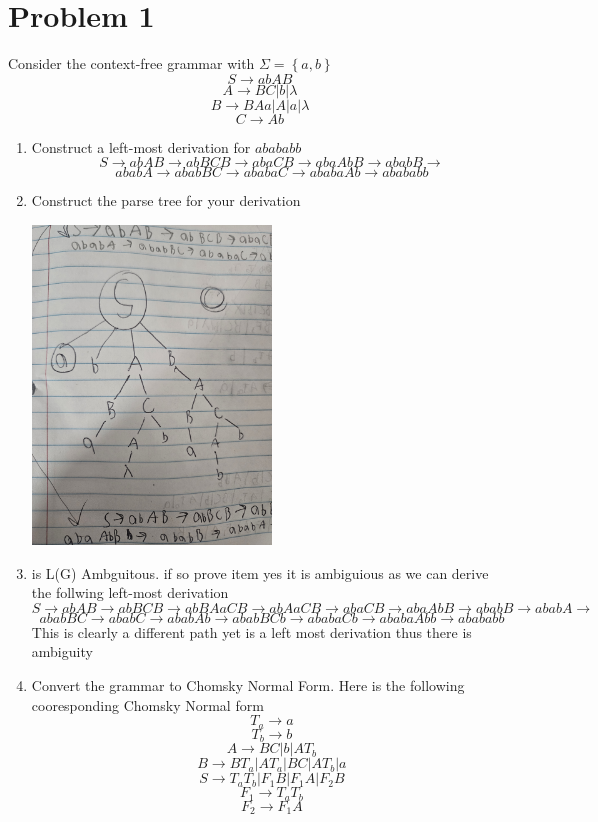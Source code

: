 \documentclass{article}
\begin{document}
\section*{Problem 1}
    Consider the context-free grammar with $\Sigma = \left\{ a,b \right\}$
    \[S \rightarrow abAB\]
    \[A \rightarrow BC|b|\lambda\]
    \[B \rightarrow BAa|A|a|\lambda\]
    \[C \rightarrow Ab\]

    \begin{enumerate}
        \item Construct a left-most derivation for $abababb$
        \[S \rightarrow abAB \rightarrow abBCB \rightarrow abaCB \rightarrow abaAbB \rightarrow ababB \rightarrow\]
        \[ ababA \rightarrow ababBC \rightarrow ababaC \rightarrow ababaAb \rightarrow abababb\]
        \item Construct the parse tree for your derivation
        \begin{center}
            \includegraphics[width=0.5\textwidth, angle=-90]{figures/tree.jpg}
        \end{center}
        \item is L(G) Ambguitous. if so prove item
        yes it is ambiguious as we can derive the follwing left-most derivation
        \[S \rightarrow abAB \rightarrow abBCB \rightarrow abBAaCB \rightarrow abAaCB \rightarrow abaCB \rightarrow abaAbB \rightarrow ababB \rightarrow ababA \rightarrow \]
        \[  ababBC \rightarrow ababC \rightarrow ababAb \rightarrow ababBCb \rightarrow ababaCb \rightarrow ababaAbb \rightarrow abababb\]
        This is clearly a different path yet is a left most derivation thus there is ambiguity  
        \item Convert the grammar to Chomsky Normal Form.
        \newpage
        Here is the following cooresponding Chomsky Normal form
        \[T_a \rightarrow a\]
        \[T_b \rightarrow b\]
        \[A \rightarrow BC | b | AT_b\]
        \[ B \rightarrow BT_a | A T_a | BC | AT_b | a\]
        \[S \rightarrow T_aT_b | F_1 B | F_1 A | F_2 B\]
        \[F_1 \rightarrow T_a T_b\]
        \[F_2 \rightarrow F_1A\]
    \end{enumerate}
\end{document}

